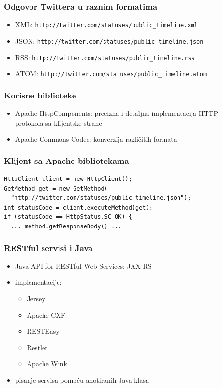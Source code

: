 \documentclass[compress]{beamer}
\begin{document}
\begin{frame}
  \frametitle{Odgovor Twittera u raznim formatima}
\begin{itemize}
\item XML: \texttt{http://twitter.com/statuses/public\_timeline.xml}
\item JSON: \texttt{http://twitter.com/statuses/public\_timeline.json}
\item RSS: \texttt{http://twitter.com/statuses/public\_timeline.rss}
\item ATOM: \texttt{http://twitter.com/statuses/public\_timeline.atom}
\end{itemize}
\end{frame}

\begin{frame}
  \frametitle{Korisne biblioteke}
\begin{itemize}
\item Apache HttpComponents: precizna i detaljna implementacija HTTP protokola sa klijentske strane
\item Apache Commons Codec: konverzija različitih formata
\end{itemize}
\end{frame}

\begin{frame}[fragile]
  \frametitle{Klijent sa Apache bibliotekama}
\begin{verbatim}
HttpClient client = new HttpClient();
GetMethod get = new GetMethod(
  "http://twitter.com/statuses/public_timeline.json");
int statusCode = client.executeMethod(get);
if (statusCode == HttpStatus.SC_OK) {
  ... method.getResponseBody() ...
\end{verbatim}
\end{frame}

\begin{frame}
  \frametitle{RESTful servisi i Java}
\begin{itemize}
\item Java API for RESTful Web Services: JAX-RS
\item implementacije:
\begin{itemize}
\item Jersey
\item Apache CXF
\item RESTEasy
\item Restlet
\item Apache Wink
\end{itemize}
\item pisanje servisa pomoću anotiranih Java klasa
\end{itemize}
\end{frame}
\end{document}
